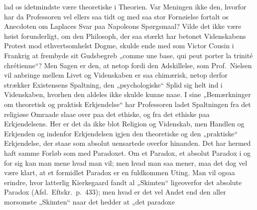 lad os idetmindste være theoretiske i Theorien. Var Meningen ikke den, hvorfor
har da Professoren vel ellers saa tidt og med saa stor Fornøielse fortalt os
Anecdoten om Laplaces Svar paa Napoleons Spørgsmaal? Vilde det ikke være høist
forunderligt, om den Philosoph, der saa stærkt har betonet Videnskabens Protest
mod ethvertsomhelst Dogme, skulde ende med som Victor Cousin i Frankrig at
frembyde sit Gudsbegreb „comme une base, qui peut porter la trinité
chrétienne“? Men Sagen er den,
at netop fordi den Adskillelse, som Prof.\ Nielsen vil anbringe mellem Livet og
Videnskaben er saa chimærisk, netop derfor strækker Existensens Spaltning, den
„psychologiske“ Splid sig helt ind i Videnskaben, hvorhen den aldeles ikke
skulde kunne naae. I sine „Bemærkninger om theoretisk og praktisk Erkjendelse“
har Professoren ladet Spaltningen fra det religiøse Omraade slaae over paa det
ethiske, og fra det ethiske paa Erkjendelsens. Her er det da ikke blot Religion
og Videnskab, men Handlen og Erkjenden og indenfor Erkjendelsen igjen den
theoretiske og den „praktiske“ Erkjendelse, der staae som absolut uensartede
overfor hinanden. Det har hermed
haft samme Forløb som med Paradoxet. Om et Paradox, et absolut
Paradox i og for sig kan man mene hvad man vil; men hvad man saa mener, maa det
dog vel være klart, at et formidlet Paradox er en fuldkommen Uting. Man vil
ogsaa erindre, hvor latterlig Kierkegaard fandt al „Skimten“ ligeoverfor det
absolute Paradox (Afsl.\ Eftskr.\ p.\ 433); men hvad er det vel Andet end den
aller morsomste „Skimten“ naar det hedder at „det paradoxe
